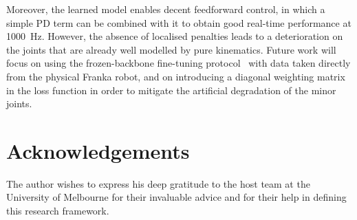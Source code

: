 \documentclass[a4paper, oneside]{article}
\begin{document}
Moreover, the learned model enables decent feedforward control, in which a simple PD term can be combined with it to obtain good real-time performance at \SI{1000}{\hertz}. However, the absence of localised penalties leads to a deterioration on the joints that are already well modelled by pure kinematics. Future work will focus on using the frozen-backbone fine-tuning protocol~\cite{duong2024} with data taken directly from the physical Franka robot, and on introducing a diagonal weighting matrix in the loss function in order to mitigate the artificial degradation of the minor joints.

\section*{Acknowledgements}
The author wishes to express his deep gratitude to the host team at the University of Melbourne for their invaluable advice and for their help in defining this research framework.

\printbibliography[title={References}]
\end{document}
